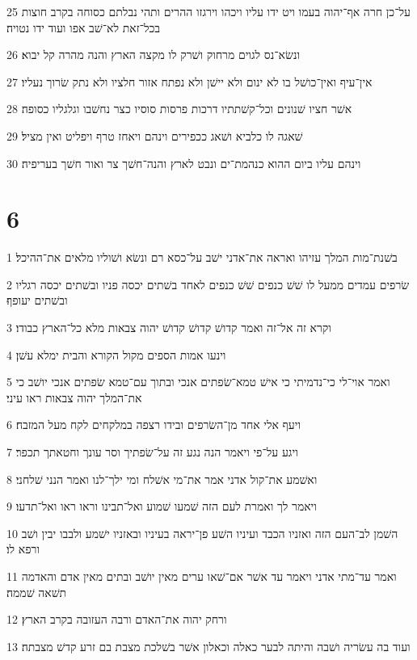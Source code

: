 \par 25 על־כן חרה אף־יהוה בעמו ויט ידו עליו ויכהו וירגזו ההרים ותהי נבלתם כסוחה בקרב חוצות בכל־זאת לא־שׁב אפו ועוד ידו נטויה׃
\par 26 ונשׂא־נס לגוים מרחוק ושׁרק לו מקצה הארץ והנה מהרה קל יבוא׃
\par 27 אין־עיף ואין־כושׁל בו לא ינום ולא יישׁן ולא נפתח אזור חלציו ולא נתק שׂרוך נעליו׃
\par 28 אשׁר חציו שׁנונים וכל־קשׁתתיו דרכות פרסות סוסיו כצר נחשׁבו וגלגליו כסופה׃
\par 29 שׁאגה לו כלביא ושׁאג ככפירים וינהם ויאחז טרף ויפליט ואין מציל׃
\par 30 וינהם עליו ביום ההוא כנהמת־ים ונבט לארץ והנה־חשׁך צר ואור חשׁך בעריפיה׃

\chapter{6}

\par 1 בשׁנת־מות המלך עזיהו ואראה את־אדני ישׁב על־כסא רם ונשׂא ושׁוליו מלאים את־ההיכל׃
\par 2 שׂרפים עמדים ממעל לו שׁשׁ כנפים שׁשׁ כנפים לאחד בשׁתים יכסה פניו ובשׁתים יכסה רגליו ובשׁתים יעופף׃
\par 3 וקרא זה אל־זה ואמר קדושׁ קדושׁ קדושׁ יהוה צבאות מלא כל־הארץ כבודו׃
\par 4 וינעו אמות הספים מקול הקורא והבית ימלא עשׁן׃
\par 5 ואמר אוי־לי כי־נדמיתי כי אישׁ טמא־שׂפתים אנכי ובתוך עם־טמא שׂפתים אנכי יושׁב כי את־המלך יהוה צבאות ראו עיני׃
\par 6 ויעף אלי אחד מן־השׂרפים ובידו רצפה במלקחים לקח מעל המזבח׃
\par 7 ויגע על־פי ויאמר הנה נגע זה על־שׂפתיך וסר עונך וחטאתך תכפר׃
\par 8 ואשׁמע את־קול אדני אמר את־מי אשׁלח ומי ילך־לנו ואמר הנני שׁלחני׃
\par 9 ויאמר לך ואמרת לעם הזה שׁמעו שׁמוע ואל־תבינו וראו ראו ואל־תדעו׃
\par 10 השׁמן לב־העם הזה ואזניו הכבד ועיניו השׁע פן־יראה בעיניו ובאזניו ישׁמע ולבבו יבין ושׁב ורפא לו׃
\par 11 ואמר עד־מתי אדני ויאמר עד אשׁר אם־שׁאו ערים מאין יושׁב ובתים מאין אדם והאדמה תשׁאה שׁממה׃
\par 12 ורחק יהוה את־האדם ורבה העזובה בקרב הארץ׃
\par 13 ועוד בה עשׂריה ושׁבה והיתה לבער כאלה וכאלון אשׁר בשׁלכת מצבת בם זרע קדשׁ מצבתה׃


